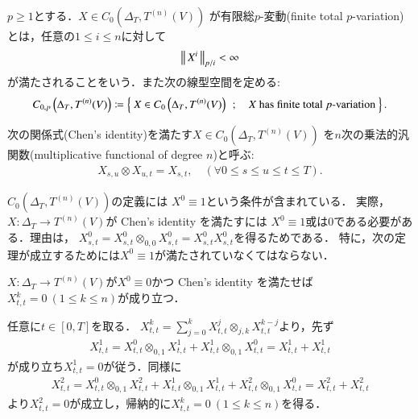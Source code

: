 	\begin{screen}
		\begin{dfn}
			$p \geq 1$とする．$X \in C_0 \left(\Delta_T,T^{(n)}(V) \right)$
			が有限総$p$-変動(finite total $p$-variation)とは，任意の$1 \leq i \leq n$に対して
			\begin{align}
				\left\|\, X^i\, \right\|_{p/i} < \infty
			\end{align}
			が満たされることをいう．また次の線型空間を定める:
			\begin{align}
				C_{0,p} \left(\Delta_T,T^{(n)}(V) \right)
				\coloneqq \left\{\ X \in C_0 \left(\Delta_T,T^{(n)}(V) \right)\ \, ; \quad \mbox{$X$ has finite total $p$-variation}\ \right\}	.
			\end{align}
		\end{dfn}
	\end{screen}
	
	\begin{screen}
		\begin{dfn}[乗法的汎関数]
			次の関係式(Chen's identity)を満たす$X \in C_0 \left(\Delta_T,T^{(n)}(V) \right)$
			を$n$次の乗法的汎関数(multiplicative functional of degree $n$)と呼ぶ:
			\begin{align}
				X_{s,u} \otimes X_{u,t} = X_{s,t},
				\quad (\forall 0 \leq s \leq u \leq t \leq T).
			\end{align}
		\end{dfn}
	\end{screen}
	
	$C_0 \left(\Delta_T,T^{(n)}(V) \right)$の定義には
	$X^0 \equiv 1$という条件が含まれている．
	実際，$X:\Delta_T \longrightarrow T^{(n)}(V)$が Chen's identity を満たすには
	$X^0 \equiv 1$或は0である必要がある．理由は，
	$X^0_{s,t} = X^0_{s,t} \otimes_{0,0} X^0_{s,t} = X^0_{s,t}X^0_{s,t}$を得るためである．
	特に，次の定理が成立するためには$X^0 \equiv 1$が満たされていなくてはならない．
	\begin{screen}
		\begin{lem}\label{lem:multiplicative_functional_vanishes_on_diagonal}
			$X:\Delta_T \longrightarrow T^{(n)}(V)$が$X^0 \equiv 0$かつ
			Chen's identity を満たせば$X^k_{t,t} = 0\ (1 \leq k \leq n)$が成り立つ．
		\end{lem}
	\end{screen}
	
	\begin{prf}
		任意に$t \in [0,T]$を取る．
		$X^k_{t,t} = \sum_{j=0}^{k} X^j_{t,t} \otimes_{j,k} X^{k-j}_{t,t}$より，先ず
		\begin{align}
			X^1_{t,t} = X^0_{t,t} \otimes_{0,1} X^1_{t,t} + X^1_{t,t} \otimes_{0,1} X^0_{t,t}
			= X^1_{t,t} + X^1_{t,t}
		\end{align}
		が成り立ち$X^1_{t,t} = 0$が従う．同様に
		\begin{align}
			X^2_{t,t} = X^0_{t,t} \otimes_{0,1} X^2_{t,t} + X^1_{t,t} \otimes_{0,1} X^1_{t,t}
				+ X^2_{t,t} \otimes_{0,1} X^0_{t,t}
			= X^2_{t,t} + X^2_{t,t}
		\end{align}
		より$X^2_{t,t} = 0$が成立し，帰納的に$X^k_{t,t} = 0\ (1 \leq k \leq n)$を得る．
		\QED
	\end{prf}
	
